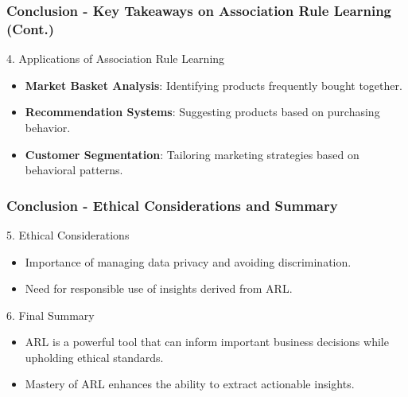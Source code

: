 \documentclass[aspectratio=169]{beamer}
\begin{document}
\begin{frame}[fragile]
    \frametitle{Conclusion - Key Takeaways on Association Rule Learning (Cont.)}

    \begin{block}{4. Applications of Association Rule Learning}
        \begin{itemize}
            \item \textbf{Market Basket Analysis}: Identifying products frequently bought together.
            \item \textbf{Recommendation Systems}: Suggesting products based on purchasing behavior.
            \item \textbf{Customer Segmentation}: Tailoring marketing strategies based on behavioral patterns.
        \end{itemize}
    \end{block}
\end{frame}

\begin{frame}[fragile]
    \frametitle{Conclusion - Ethical Considerations and Summary}

    \begin{block}{5. Ethical Considerations}
        \begin{itemize}
            \item Importance of managing data privacy and avoiding discrimination.
            \item Need for responsible use of insights derived from ARL.
        \end{itemize}
    \end{block}

    \begin{block}{6. Final Summary}
        \begin{itemize}
            \item ARL is a powerful tool that can inform important business decisions while upholding ethical standards.
            \item Mastery of ARL enhances the ability to extract actionable insights.
        \end{itemize}
    \end{block}
\end{frame}
\end{document}
